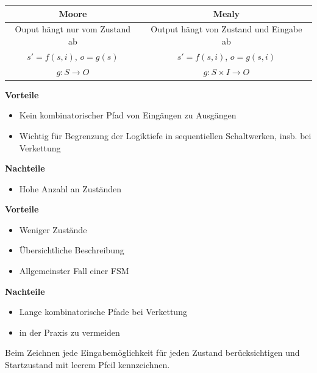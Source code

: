 \documentclass[6pt,a4paper]{scrartcl}
\newcommand{\ra}[0]{\ensuremath{\rightarrow}} 									%
\begin{document}
\begin{multicols*}{3}
\begin{tabular}{c | c}
 Moore & Mealy \\ \hline
 Ouput hängt nur vom Zustand ab & Output hängt von Zustand und Eingabe ab\\
 $s'=f(s,i)$, $o=g(s)$ &  $s'=f(s,i)$, $o=g(s,i)$ \\
 $g: S \ra O$ & $g: S \times I \ra O$
\end{tabular}

\begin{multicols}{2}
\noindent\textbf{Vorteile}
\begin{itemize} \itemsep0pt
 \item Kein kombinatorischer Pfad von Eingängen zu Ausgängen
 \item Wichtig für Begrenzung der Logiktiefe in sequentiellen Schaltwerken, insb. bei Verkettung
\end{itemize}
\textbf{Nachteile}
\begin{itemize} \itemsep0pt
 \item Hohe Anzahl an Zuständen
\end{itemize}
\pagebreak
\textbf{Vorteile}
\begin{itemize} \itemsep0pt
 \item Weniger Zustände
 \item Übersichtliche Beschreibung
 \item Allgemeinster Fall einer FSM
\end{itemize}
\textbf{Nachteile}
\begin{itemize} \itemsep0pt
 \item Lange kombinatorische Pfade bei Verkettung
 \item in der Praxis zu vermeiden
\end{itemize}
\end{multicols}
Beim Zeichnen jede Eingabemöglichkeit für jeden Zustand berücksichtigen und Startzustand mit leerem Pfeil kennzeichnen.


\end{multicols*}
\end{document}
